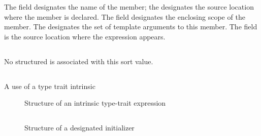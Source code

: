The  field designates the name of the member; the  designates the source location where the member is declared.
The  field designates the enclosing scope of the member.  The  designates the set of template arguments to
this member.
The field  is the source location where the expression appears.



\subsection{}
\label{sec:ifc:ExprSort:Unused1}

No structured is associated with this sort value.


\subsection{}
\label{sec:ifc:ExprSort:TypeTraitIntrinsic}

A use of a type trait intrinsic

%
\begin{figure}[H]
	\centering
	\caption{Structure of an intrinsic type-trait expression}
	\label{fig:ifc-type-trait-expression-structure}
\end{figure}



\subsection{}
\label{sec:ifc:ExprSort:DesignatedInitializer}

\begin{figure}[H]
	\centering
	\caption{Structure of a designated initializer}
	\label{fig:ifc-designated-initializer-structure}
\end{figure}

